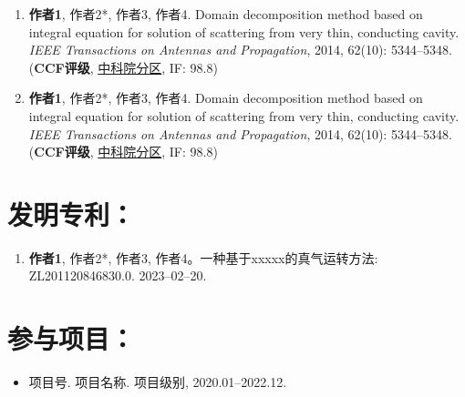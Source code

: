 \documentclass[print, promaster, vlined]{DissertUESTC}
\begin{document}
	\begin{enumerate}
	    \item \textbf{作者1}, 作者2*, 作者3, 作者4. Domain decomposition method based on integral equation for solution of scattering from very thin, conducting cavity. \emph{IEEE Transactions on Antennas and Propagation}, 2014, 62(10): 5344--5348. (\textbf{CCF评级}, \underline{中科院分区}, IF: 98.8)
	    
		\setcounter{enumi}{98}
	    
		\item \textbf{作者1}, 作者2*, 作者3, 作者4. Domain decomposition method based on integral equation for solution of scattering from very thin, conducting cavity. \emph{IEEE Transactions on Antennas and Propagation}, 2014, 62(10): 5344--5348. (\textbf{CCF评级}, \underline{中科院分区}, IF: 98.8)
	\end{enumerate}
	
	\section*{发明专利：}
	

	\begin{enumerate}
		
		\item \textbf{作者1}, 作者2*, 作者3, 作者4。一种基于xxxxx的真气运转方法: ZL201120846830.0. 2023--02--20.
		
	\end{enumerate}
	
	\section*{参与项目：}
	
	\begin{itemize}
		\item 项目号. 项目名称. 项目级别, 2020.01--2022.12.
	\end{itemize}
\end{document}
